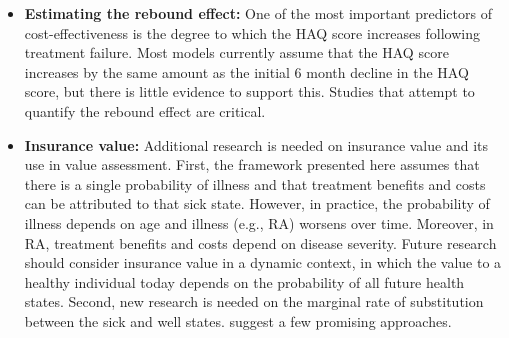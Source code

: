 \documentclass[11pt,final,fleqn]{article}
\theoremstyle{plain}
\begin{document}
\begin{itemize}
\item \textbf{Estimating the rebound effect:} One of the most important predictors of cost-effectiveness is the degree to which the HAQ score increases following treatment failure. Most models currently assume that the HAQ score increases by the same amount as the initial 6 month decline in the HAQ score, but there is little evidence to support this. Studies that attempt to quantify the rebound effect are critical. 
\item \textbf{Insurance value:} Additional research is needed on insurance value and its use in value assessment. First, the framework presented here assumes that there is a single probability of illness and that treatment benefits and costs can be attributed to that sick state. However, in practice, the probability of illness depends on age and illness (e.g., RA) worsens over time. Moreover, in RA, treatment benefits and costs depend on disease severity. Future research should consider insurance value in a dynamic context, in which the value to a healthy individual today depends on the probability of all future health states. Second, new research is needed on the marginal rate of substitution between the sick and well states. \citet{lakdawalla2017insurance} suggest a few promising approaches.     
\end{itemize}
\end{document}
